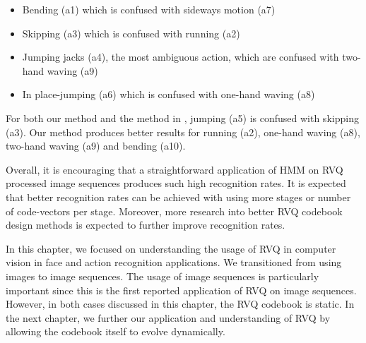 \begin{Body}
\begin{itemize}
\item Bending (a1) which is confused with sideways motion (a7)
\item Skipping (a3) which is confused with running (a2)
\item Jumping jacks (a4), the most ambiguous action, which are confused with two-hand waving (a9)
\item In place-jumping (a6) which is confused with one-hand waving (a8)
\end{itemize}

For both our method and the method in \cite{2007_JNL_SpaceTimeShapes_Gorelick}, jumping (a5) is confused with skipping (a3).  Our method produces better results for running (a2), one-hand waving (a8), two-hand waving (a9) and bending (a10).  

Overall, it is encouraging that a straightforward application of HMM on RVQ processed image sequences produces such high recognition rates.  It is expected that better recognition rates can be achieved with using more stages or number of code-vectors per stage.  Moreover, more research into better RVQ codebook design methods is expected to further improve recognition rates.  

In this chapter, we focused on understanding the usage of RVQ in computer vision in face and action recognition applications.  We transitioned from using images to image sequences.  The usage of image sequences is particularly important since this is the first reported application of RVQ on image sequences.  However, in both cases discussed in this chapter, the RVQ codebook is static.  In the next chapter, we further our application and understanding of RVQ by allowing the codebook itself to evolve dynamically.

\end{Body}
\begin{EndMatter}
\end{EndMatter}

